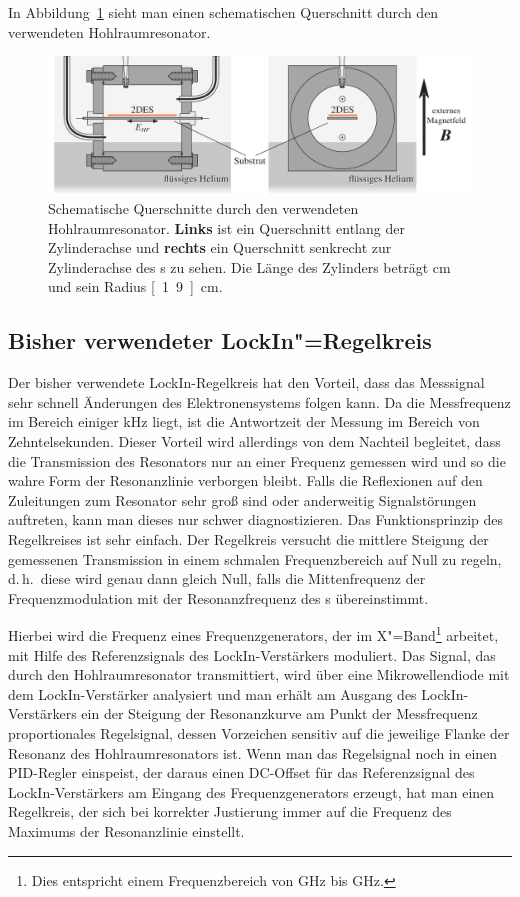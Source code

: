 In Abbildung~\ref{fig:cavity_quer} sieht man einen schematischen Querschnitt durch den verwendeten Hohlraumresonator.
\begin{figure}[h!tbp]
	\centerline{\includegraphics[width=\textwidth]{exp_aufbau/CavityQuerschnitt}}
	\caption[Der Hohlraumresonator im Querschnitt]{Schematische Querschnitte durch den verwendeten Hohlraumresonator. {\bfseries Links} ist ein Querschnitt entlang der Zylinderachse und {\bfseries rechts} ein Querschnitt senkrecht zur Zylinderachse des \HR s zu sehen. Die Länge des Zylinders beträgt \unit[2]{cm} und sein Radius \unit[1.9]{cm}.}
	\label{fig:cavity_quer}
\end{figure}

\subsection{Bisher verwendeter LockIn"=Regelkreis}
\label{ssec:old_method}
\enlargethispage{1\baselineskip}

Der bisher verwendete LockIn-Regelkreis hat den Vorteil, dass das Messsignal sehr schnell Änderungen des Elektronensystems folgen kann. Da die Messfrequenz im Bereich einiger kHz liegt, ist die Antwortzeit der Messung im Bereich von Zehntelsekunden. Dieser Vorteil wird allerdings von dem Nachteil begleitet, dass die Transmission des Resonators nur an einer Frequenz gemessen wird und so die wahre Form der Resonanzlinie verborgen bleibt. Falls die Reflexionen auf den Zuleitungen zum Resonator sehr groß sind oder anderweitig Signalstörungen auftreten, kann man dieses nur schwer diagnostizieren. Das Funktionsprinzip des Regelkreises ist sehr einfach. Der Regelkreis versucht die mittlere Steigung der gemessenen Transmission in einem schmalen Frequenzbereich auf Null zu regeln, d.\,h.\ diese wird genau dann gleich Null, falls die Mittenfrequenz der Frequenzmodulation mit der Resonanzfrequenz des \HR{}s übereinstimmt.

Hierbei wird die Frequenz eines Frequenzgenerators, der im X"=Band\footnote{Dies entspricht einem Frequenzbereich von \unit[8]{GHz} bis \unit[12]{GHz}.} arbeitet, mit Hilfe des Referenzsignals des LockIn-Verstärkers moduliert. Das Signal, das durch den Hohlraumresonator transmittiert, wird über eine Mikrowellendiode mit dem LockIn-Verstärker analysiert und man erhält am Ausgang des LockIn-Verstärkers ein der Steigung der Resonanzkurve am Punkt der Messfrequenz proportionales Regelsignal, dessen Vorzeichen sensitiv auf die jeweilige Flanke der Resonanz des Hohlraumresonators ist. Wenn man das Regelsignal noch in einen PID-Regler einspeist, der daraus einen DC-Offset für das Referenzsignal des LockIn-Verstärkers am Eingang des Frequenzgenerators erzeugt, hat man einen Regelkreis, der sich bei korrekter Justierung immer auf die Frequenz des Maximums der Resonanzlinie einstellt.

